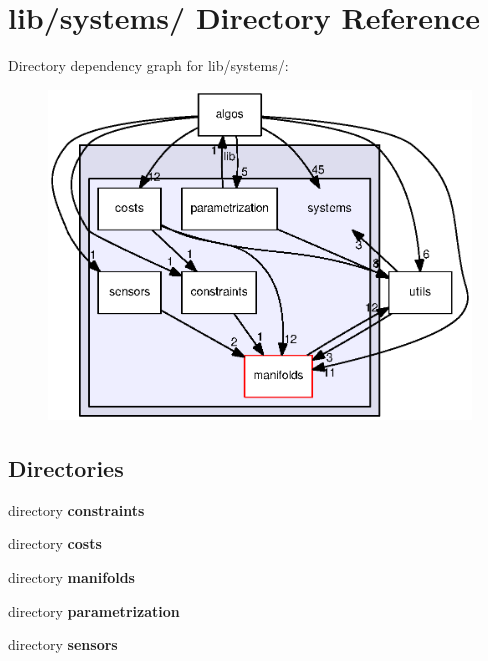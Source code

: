 \section{lib/systems/ \-Directory \-Reference}
\label{dir_3d1c4eb1f88f1e305138f3f2d45ef2b1}
\-Directory dependency graph for lib/systems/\-:
\nopagebreak
\begin{figure}[H]
\begin{center}
\leavevmode
\includegraphics[width=350pt]{dir_3d1c4eb1f88f1e305138f3f2d45ef2b1_dep}
\end{center}
\end{figure}
\subsection*{\-Directories}
\begin{DoxyCompactItemize}
\item 
directory {\bf constraints}
\item 
directory {\bf costs}
\item 
directory {\bf manifolds}
\item 
directory {\bf parametrization}
\item 
directory {\bf sensors}
\end{DoxyCompactItemize}
